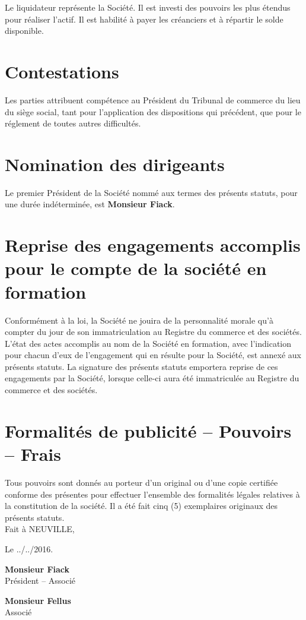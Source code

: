 \documentclass[a4paper,12pt]{report}
\begin{document}
Le liquidateur représente la Société. 
Il est investi des pouvoirs les plus étendus pour réaliser l'actif. 
Il est habilité à payer les créanciers et à répartir le solde disponible.

\section{Contestations}
Les parties attribuent compétence au Président du Tribunal de commerce du lieu du siège social, 
tant pour l'application des dispositions qui précédent, que pour le réglement de toutes autres difficultés.

\section{Nomination des dirigeants}
Le premier Président de la Société nommé aux termes des présents statuts, pour une durée indéterminée, est \textbf{Monsieur Fiack}.

\section{Reprise des engagements accomplis pour le compte de la société en formation}
Conformément à la loi, la Société ne jouira de la personnalité morale qu'à compter du jour de son immatriculation au Registre du commerce et des sociétés.
L'état des actes accomplis au nom de la Société en formation, avec l'indication pour chacun d'eux de l'engagement qui en résulte pour la Société, est annexé aux présents statuts.
La signature des présents statuts emportera reprise de ces engagements par la Société, lorsque celle-ci aura été immatriculée au Registre du commerce et des sociétés.

\section{Formalités de publicité -- Pouvoirs -- Frais}
Tous pouvoirs sont donnés au porteur d'un original ou d'une copie certifiée conforme des présentes pour effectuer l'ensemble des formalités légales relatives à la constitution de la société.
Il a été fait cinq (5) exemplaires originaux des présents statuts.\\

Fait à NEUVILLE,

Le ../../2016.\\

\vspace{2cm}

\begin{minipage}{0.45\linewidth}
	\center
	\textbf{Monsieur Fiack}\\
	Président -- Associé
\end{minipage}
\begin{minipage}{0.45\linewidth}
	\center
	\textbf{Monsieur Fellus}\\
	Associé
\end{minipage}

\end{document}
